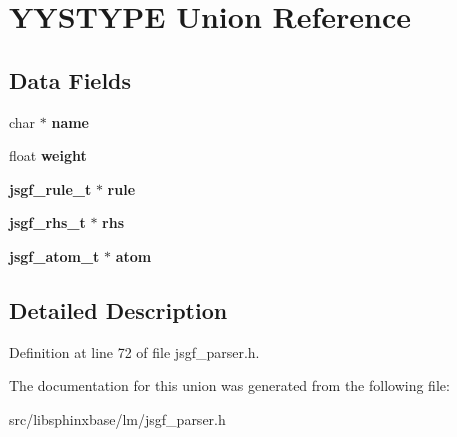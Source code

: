 \section{Y\-Y\-S\-T\-Y\-P\-E Union Reference}
\label{unionYYSTYPE}
\subsection*{Data Fields}
\begin{DoxyCompactItemize}
\item 
char $\ast$ {\bfseries name}\label{unionYYSTYPE_abe6c47e6bc1b2078e6717c0103b4ef02}

\item 
float {\bfseries weight}\label{unionYYSTYPE_aac85eedd248804c0acb4be775be5bfd0}

\item 
{\bf jsgf\-\_\-rule\-\_\-t} $\ast$ {\bfseries rule}\label{unionYYSTYPE_ac36b0d3e83c3867cb5fafc5d42bf3869}

\item 
{\bf jsgf\-\_\-rhs\-\_\-t} $\ast$ {\bfseries rhs}\label{unionYYSTYPE_a348bf1e5bbf1c61ed7cf8daecbb689b9}

\item 
{\bf jsgf\-\_\-atom\-\_\-t} $\ast$ {\bfseries atom}\label{unionYYSTYPE_a8647595b3993f58bc794592246a60fea}

\end{DoxyCompactItemize}


\subsection{Detailed Description}


Definition at line 72 of file jsgf\-\_\-parser.\-h.



The documentation for this union was generated from the following file\-:\begin{DoxyCompactItemize}
\item 
src/libsphinxbase/lm/jsgf\-\_\-parser.\-h\end{DoxyCompactItemize}

